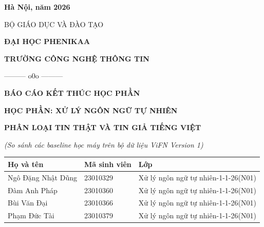 \documentclass[12pt,a4paper]{report}
\begin{document}
\begin{titlepage}
\begin{center}
  \vspace{1.2cm}
  \begin{flushleft}
  \end{flushleft}

  \vfill
  {\fontsize{13pt}{15pt}\selectfont \textbf{Hà Nội, năm 2026}\par}
\end{center}
\end{titlepage}

\begin{titlepage}
\thispagestyle{empty}
\begin{center}
  {\fontsize{13pt}{15pt}\selectfont BỘ GIÁO DỤC VÀ ĐÀO TẠO\par}
  {\fontsize{14pt}{17pt}\selectfont \textbf{ĐẠI HỌC PHENIKAA}\par}
  {\fontsize{14pt}{17pt}\selectfont \textbf{TRƯỜNG CÔNG NGHỆ THÔNG TIN}\par}
  \vspace{0.4cm}
  {\fontsize{11pt}{13pt}\selectfont ——— o0o ———\par}
  \vspace{2.5cm}

  {\fontsize{17pt}{21pt}\selectfont \textbf{BÁO CÁO KẾT THÚC HỌC PHẦN}\par}
  \vspace{0.6cm}
  {\fontsize{14pt}{17pt}\selectfont \textbf{HỌC PHẦN: XỬ LÝ NGÔN NGỮ TỰ NHIÊN}\par}
  \vspace{1.0cm}
  {\fontsize{16pt}{20pt}\selectfont \textbf{PHÂN LOẠI TIN THẬT VÀ TIN GIẢ TIẾNG VIỆT}\par}
  \vspace{0.4cm}
  {\fontsize{13pt}{16pt}\selectfont \textit{(So sánh các baseline học máy trên bộ dữ liệu ViFN Version 1)}\par}
  
  \vspace{2.2cm}

  \begin{tabular}{p{5.24cm} p{2.93cm} p{5.62cm}}
    \hline
    \textbf{Họ và tên} & \textbf{Mã sinh viên} & \textbf{Lớp} \\
    \hline
    Ngô Đặng Nhật Dũng & 23010329 & Xử lý ngôn ngữ tự nhiên-1-1-26(N01) \\
    Đàm Anh Pháp       & 23010360 & Xử lý ngôn ngữ tự nhiên-1-1-26(N01) \\
    Bùi Văn Đại        & 23010366 & Xử lý ngôn ngữ tự nhiên-1-1-26(N01) \\
    Phạm Đức Tài       & 23010379 & Xử lý ngôn ngữ tự nhiên-1-1-26(N01) \\
    \hline
  \end{tabular}


\end{center}
\end{titlepage}
\end{document}
